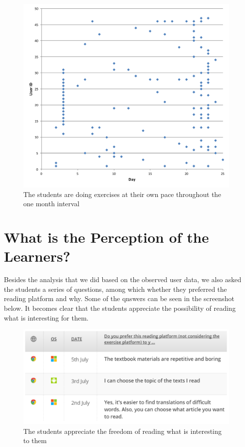   \begin{figure}[h!]
  \centering
    \includegraphics[width=\columnwidth]{figures/user_exercise_activity_vs_day.pdf}
    \caption{The students are doing exercises at their own pace throughout the one month interval }
  \end{figure}

\newpage
\section{What is the Perception of the Learners?}

Besides the analysis that we did based on the observed user data, we also asked the students a series of questions, among which whether they preferred the reading platform and why. Some of the qnswers can be seen in the screenshot below. It becomes clear that the students appreciate the possibility of reading what is interesting for them.

    \begin{figure}[h!]
    \centering
      \includegraphics[width=0.9\columnwidth]{figures/opinion_on_reading_platform}
      \caption{The students appreciate the freedom of reading what is interesting to them }
    \end{figure}

